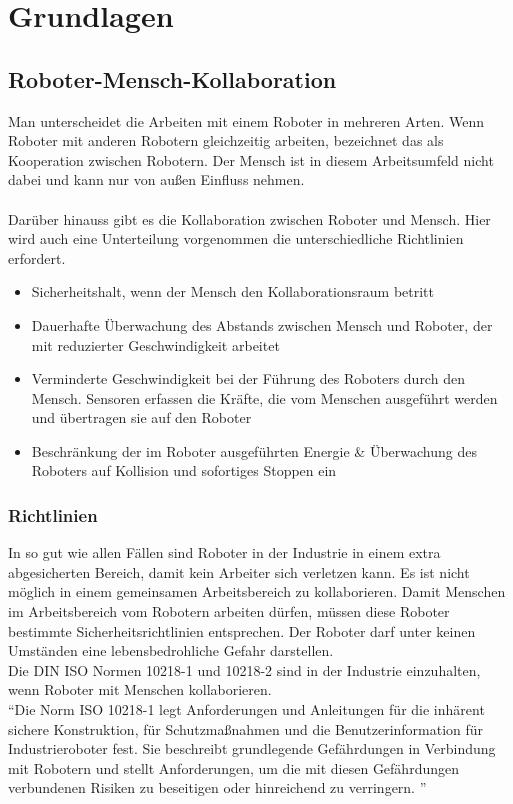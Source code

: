 \chapter{Grundlagen}

\section{Roboter-Mensch-Kollaboration}
\label{sec:roboter-mensch-kollaboration_gru}

Man unterscheidet die Arbeiten mit einem Roboter in mehreren Arten.
Wenn Roboter mit anderen Robotern gleichzeitig arbeiten, bezeichnet das als Kooperation zwischen Robotern.
Der Mensch ist in diesem Arbeitsumfeld nicht dabei und kann nur von außen Einfluss nehmen.
\\\\
Darüber hinauss gibt es die Kollaboration zwischen Roboter und Mensch.
Hier wird auch eine Unterteilung vorgenommen die unterschiedliche Richtlinien erfordert.

\begin{itemize}
\item Sicherheitshalt, wenn der Mensch den Kollaborationsraum betritt
\item Dauerhafte Überwachung des Abstands zwischen Mensch und Roboter, der mit reduzierter Geschwindigkeit arbeitet
\item Verminderte Geschwindigkeit bei der Führung des Roboters durch den Mensch. Sensoren erfassen die Kräfte, die vom Menschen ausgeführt werden und übertragen sie auf den Roboter
\item Beschränkung der im Roboter ausgeführten Energie \& Überwachung des Roboters auf Kollision und sofortiges Stoppen ein
\end{itemize}

\subsection{Richtlinien}
\label{kol_richtlinien_gru}

In so gut wie allen Fällen sind Roboter in der Industrie in einem extra abgesicherten Bereich, damit kein Arbeiter sich verletzen kann. Es ist nicht möglich in einem gemeinsamen Arbeitsbereich zu kollaborieren.
Damit Menschen im Arbeitsbereich vom Robotern arbeiten dürfen, müssen diese Roboter bestimmte Sicherheitsrichtlinien entsprechen.
Der Roboter darf unter keinen Umständen eine lebensbedrohliche Gefahr darstellen. \\ Die DIN ISO Normen 10218-1 und 10218-2 sind in der Industrie einzuhalten, wenn Roboter mit Menschen kollaborieren.
\\
``Die Norm ISO 10218-1 legt Anforderungen und Anleitungen für die inhärent sichere Konstruktion, für Schutzmaßnahmen und die Benutzerinformation für Industrieroboter fest. Sie beschreibt grundlegende Gefährdungen in Verbindung mit Robotern und stellt Anforderungen, um die mit diesen Gefährdungen verbundenen Risiken zu beseitigen oder hinreichend zu verringern. '' \cite{DINISO-2012}

